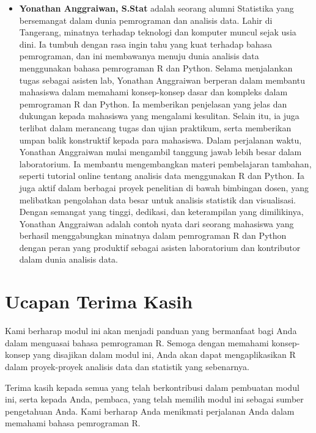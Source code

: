 \documentclass[
]{book}
\providecommand{\tightlist}{%
  \setlength{\itemsep}{0pt}\setlength{\parskip}{0pt}}
\begin{document}
\begin{itemize}
\tightlist
\item
  \textbf{Yonathan Anggraiwan, S.Stat} adalah seorang alumni Statistika yang bersemangat dalam dunia pemrograman dan analisis data. Lahir di Tangerang, minatnya terhadap teknologi dan komputer muncul sejak usia dini. Ia tumbuh dengan rasa ingin tahu yang kuat terhadap bahasa pemrograman, dan ini membawanya menuju dunia analisis data menggunakan bahasa pemrograman R dan Python. Selama menjalankan tugas sebagai asisten lab, Yonathan Anggraiwan berperan dalam membantu mahasiswa dalam memahami konsep-konsep dasar dan kompleks dalam pemrograman R dan Python. Ia memberikan penjelasan yang jelas dan dukungan kepada mahasiswa yang mengalami kesulitan. Selain itu, ia juga terlibat dalam merancang tugas dan ujian praktikum, serta memberikan umpan balik konstruktif kepada para mahasiswa. Dalam perjalanan waktu, Yonathan Anggraiwan mulai mengambil tanggung jawab lebih besar dalam laboratorium. Ia membantu mengembangkan materi pembelajaran tambahan, seperti tutorial online tentang analisis data menggunakan R dan Python. Ia juga aktif dalam berbagai proyek penelitian di bawah bimbingan dosen, yang melibatkan pengolahan data besar untuk analisis statistik dan visualisasi. Dengan semangat yang tinggi, dedikasi, dan keterampilan yang dimilikinya, Yonathan Anggraiwan adalah contoh nyata dari seorang mahasiswa yang berhasil menggabungkan minatnya dalam pemrograman R dan Python dengan peran yang produktif sebagai asisten laboratorium dan kontributor dalam dunia analisis data.
\end{itemize}

\hypertarget{ucapan-terima-kasih}{%
\section*{Ucapan Terima Kasih}\label{ucapan-terima-kasih}}

Kami berharap modul ini akan menjadi panduan yang bermanfaat bagi Anda dalam menguasai bahasa pemrograman R. Semoga dengan memahami konsep-konsep yang disajikan dalam modul ini, Anda akan dapat mengaplikasikan R dalam proyek-proyek analisis data dan statistik yang sebenarnya.

Terima kasih kepada semua yang telah berkontribusi dalam pembuatan modul ini, serta kepada Anda, pembaca, yang telah memilih modul ini sebagai sumber pengetahuan Anda. Kami berharap Anda menikmati perjalanan Anda dalam memahami bahasa pemrograman R.
\end{document}

